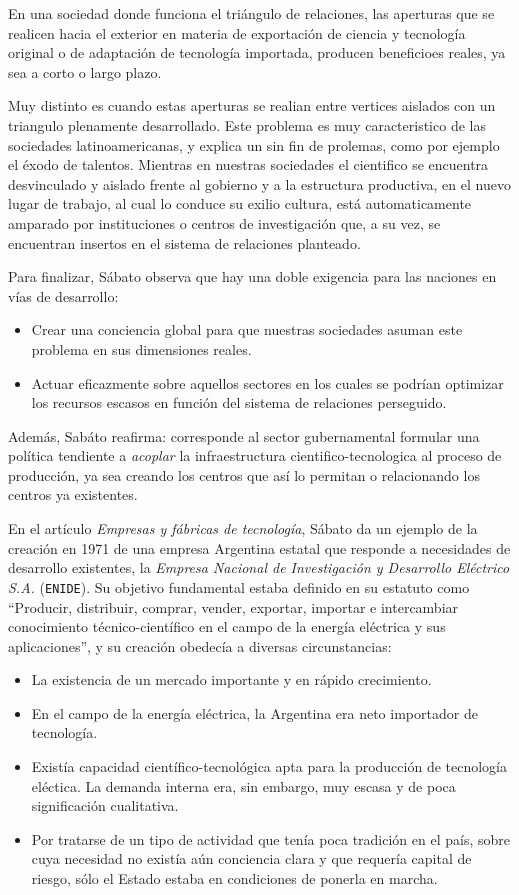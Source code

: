 En una sociedad donde funciona el triángulo de relaciones, las aperturas que se realicen hacia el exterior en materia de exportación de ciencia y tecnología original o de adaptación de tecnología importada, producen beneficioes reales, ya sea a corto o largo plazo.

Muy distinto es cuando estas aperturas se realian entre vertices aislados con un triangulo plenamente desarrollado. Este problema es muy caracteristico de las sociedades latinoamericanas, y explica un sin fin de prolemas, como por ejemplo el éxodo de talentos. Mientras en nuestras sociedades el cientifico se encuentra desvinculado y aislado frente al gobierno y a la estructura productiva, en el nuevo lugar de trabajo, al cual lo conduce su exilio cultura, está automaticamente amparado por instituciones o centros de investigación que, a su vez, se encuentran insertos en el sistema de relaciones planteado.

Para finalizar, Sábato observa que hay una doble exigencia para las naciones en vías de desarrollo:
\begin{itemize}
    \item Crear una conciencia global para que nuestras sociedades asuman este problema en sus dimensiones reales.
    \item Actuar eficazmente sobre aquellos sectores en los cuales se podrían optimizar los recursos escasos en función del sistema de relaciones perseguido.
\end{itemize}

Además, Sabáto reafirma: corresponde al sector gubernamental formular una política tendiente a \textit{acoplar} la infraestructura cientifico-tecnologica al proceso de producción, ya sea creando los centros que así lo permitan o relacionando los centros ya existentes.


En el artículo \textit{Empresas y fábricas de tecnología}, Sábato da un ejemplo de la creación en 1971 de una empresa Argentina estatal que responde a necesidades de desarrollo existentes, la \textit{Empresa Nacional de Investigación y Desarrollo Eléctrico S.A.} (\texttt{ENIDE}). Su objetivo fundamental estaba definido en su estatuto como ``Producir, distribuir, comprar, vender, exportar, importar e intercambiar conocimiento técnico-científico en el campo de la energía eléctrica y sus aplicaciones'', y su creación obedecía a diversas circunstancias:

\begin{itemize}
    \item La existencia de un mercado importante y en rápido crecimiento.
    \item En el campo de la energía eléctrica, la Argentina era neto importador de tecnología.
    \item Existía capacidad científico-tecnológica apta para la producción de tecnología eléctica. La demanda interna era, sin embargo, muy escasa y de poca significación cualitativa.
    \item Por tratarse de un tipo de actividad que tenía poca tradición en el país, sobre cuya necesidad no existía aún conciencia clara y que requería capital de riesgo, sólo el Estado estaba en condiciones de ponerla en marcha.
\end{itemize}

